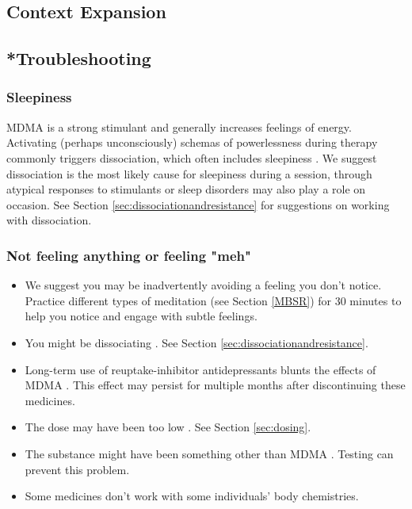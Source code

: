 \documentclass[12pt,letterpaper]{article}
\begin{document}
\subsection{Context Expansion}
\subsection{*Troubleshooting}
\subsubsection{Sleepiness}
MDMA is a strong stimulant and generally increases feelings of energy. Activating (perhaps unconsciously) schemas of powerlessness during therapy commonly triggers dissociation, which often includes sleepiness \cite{kozlowskaDefenseCascade}. We suggest dissociation is the most likely cause for sleepiness during a session, through atypical responses to stimulants or sleep disorders may also play a role on occasion. See Section \ref{sec:dissociationandresistance} for suggestions on working with dissociation.
\subsubsection{Not feeling anything or feeling "meh"}
\begin{itemize}
    \item We suggest you may be inadvertently avoiding a feeling you don't notice. Practice different types of meditation (see Section \ref{MBSR}) for 30 minutes to help you notice and engage with subtle feelings.
    \item You might be dissociating \cite{kozlowskaDefenseCascade}. See Section \ref{sec:dissociationandresistance}. 
    \item Long-term use of reuptake-inhibitor antidepressants blunts the effects of MDMA \cite{feducciaSSRIDiscontinuation}. This effect may persist for multiple months after discontinuing these medicines.
    \item The dose may have been too low \cite{bediMDMALowDose}. See Section \ref{sec:dosing}.
    \item The substance might have been something other than MDMA \cite{saleemiAdulterants}. Testing can prevent this problem.
    \item Some medicines don't work with some individuals' body chemistries.
\end{itemize}
\end{document}
